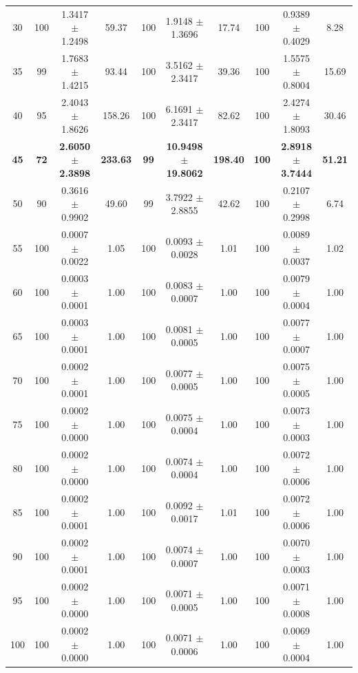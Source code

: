 \begin{table}[H]
{\begin{tabular}{@{}c ccc ccc ccc@{}}
        30  & 100 & 1.3417 $\pm$ 1.2498 & 59.37  & 100 & 1.9148 $\pm$ 1.3696 & 17.74  & 100 & 0.9389 $\pm$ 0.4029 & 8.28 \\
        35  & 99  & 1.7683 $\pm$ 1.4215 & 93.44  & 100 & 3.5162 $\pm$ 2.3417 & 39.36  & 100 & 1.5575 $\pm$ 0.8004 & 15.69 \\
        40  & 95  & 2.4043 $\pm$ 1.8626 & 158.26 & 100 & 6.1691 $\pm$ 2.3417 & 82.62  & 100 & 2.4274 $\pm$ 1.8093 & 30.46 \\
        \textbf{45}  & \textbf{72}  & \textbf{2.6050 $\pm$ 2.3898} & \textbf{233.63} & \textbf{99}  & \textbf{10.9498 $\pm$ 19.8062}& \textbf{198.40}& \textbf{100} & \textbf{2.8918 $\pm$ 3.7444} & \textbf{51.21} \\
        50  & 90  & 0.3616 $\pm$ 0.9902 & 49.60  & 99  & 3.7922 $\pm$ 2.8855 & 42.62  & 100 & 0.2107 $\pm$ 0.2998 & 6.74 \\
        55  & 100 & 0.0007 $\pm$ 0.0022 & 1.05   & 100 & 0.0093 $\pm$ 0.0028 & 1.01   & 100 & 0.0089 $\pm$ 0.0037 & 1.02 \\
        60  & 100 & 0.0003 $\pm$ 0.0001 & 1.00   & 100 & 0.0083 $\pm$ 0.0007 & 1.00   & 100 & 0.0079 $\pm$ 0.0004 & 1.00 \\
        65  & 100 & 0.0003 $\pm$ 0.0001 & 1.00   & 100 & 0.0081 $\pm$ 0.0005 & 1.00   & 100 & 0.0077 $\pm$ 0.0007 & 1.00 \\
        70  & 100 & 0.0002 $\pm$ 0.0001 & 1.00   & 100 & 0.0077 $\pm$ 0.0005 & 1.00   & 100 & 0.0075 $\pm$ 0.0005 & 1.00 \\
        75  & 100 & 0.0002 $\pm$ 0.0000 & 1.00   & 100 & 0.0075 $\pm$ 0.0004 & 1.00   & 100 & 0.0073 $\pm$ 0.0003 & 1.00 \\
        80  & 100 & 0.0002 $\pm$ 0.0000 & 1.00   & 100 & 0.0074 $\pm$ 0.0004 & 1.00   & 100 & 0.0072 $\pm$ 0.0006 & 1.00 \\
        85  & 100 & 0.0002 $\pm$ 0.0001 & 1.00   & 100 & 0.0092 $\pm$ 0.0017 & 1.01   & 100 & 0.0072 $\pm$ 0.0006 & 1.00 \\
        90  & 100 & 0.0002 $\pm$ 0.0001 & 1.00   & 100 & 0.0074 $\pm$ 0.0007 & 1.00   & 100 & 0.0070 $\pm$ 0.0003 & 1.00 \\
        95  & 100 & 0.0002 $\pm$ 0.0000 & 1.00   & 100 & 0.0071 $\pm$ 0.0005 & 1.00   & 100 & 0.0071 $\pm$ 0.0008 & 1.00 \\
        100 & 100 & 0.0002 $\pm$ 0.0000 & 1.00   & 100 & 0.0071 $\pm$ 0.0006 & 1.00   & 100 & 0.0069 $\pm$ 0.0004 & 1.00 \\
        \bottomrule
    \end{tabular}}
\end{table}


